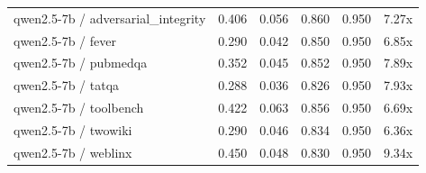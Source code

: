 \begin{table}[h]
\begin{tabular}{l|cc|cc|c}
qwen2.5-7b / adversarial_integrity & 0.406 & 0.056 & 0.860 & 0.950 & 7.27x \\
qwen2.5-7b / fever & 0.290 & 0.042 & 0.850 & 0.950 & 6.85x \\
qwen2.5-7b / pubmedqa & 0.352 & 0.045 & 0.852 & 0.950 & 7.89x \\
qwen2.5-7b / tatqa & 0.288 & 0.036 & 0.826 & 0.950 & 7.93x \\
qwen2.5-7b / toolbench & 0.422 & 0.063 & 0.856 & 0.950 & 6.69x \\
qwen2.5-7b / twowiki & 0.290 & 0.046 & 0.834 & 0.950 & 6.36x \\
qwen2.5-7b / weblinx & 0.450 & 0.048 & 0.830 & 0.950 & 9.34x \\
\hline
\end{tabular}
\end{table}
